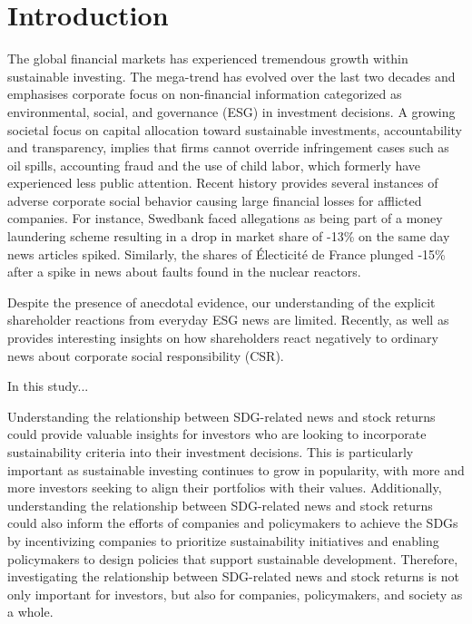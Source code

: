 \section{Introduction} \label{sec:intro}

The global financial markets has experienced tremendous growth within sustainable investing. The mega-trend has evolved over the last two decades and emphasises corporate focus on non-financial information categorized as environmental, social, and governance (ESG) in investment decisions. A growing societal focus on capital allocation toward sustainable investments, accountability and transparency, implies that firms cannot override infringement cases such as oil spills, accounting fraud and the use of child labor, which formerly have experienced less public attention. Recent history provides several instances of adverse corporate social behavior causing large financial losses for afflicted companies. For instance, Swedbank faced allegations as being part of a money laundering scheme resulting in a drop in market share of -13\% on the same day news articles spiked. Similarly, the shares of Électicité de France plunged -15\% after a spike in news about faults found in the nuclear reactors. 

Despite the presence of anecdotal evidence, our understanding of the explicit shareholder reactions from everyday ESG news are limited. Recently, \cite{Blancard_ESG_sentiment} as well as \cite{kruger2015corporate} provides interesting insights on how shareholders react negatively to ordinary news about corporate social responsibility (CSR). 

In this study...



Understanding the relationship between SDG-related news and stock returns could provide valuable insights for investors who are looking to incorporate sustainability criteria into their investment decisions. This is particularly important as sustainable investing continues to grow in popularity, with more and more investors seeking to align their portfolios with their values. Additionally, understanding the relationship between SDG-related news and stock returns could also inform the efforts of companies and policymakers to achieve the SDGs by incentivizing companies to prioritize sustainability initiatives and enabling policymakers to design policies that support sustainable development. Therefore, investigating the relationship between SDG-related news and stock returns is not only important for investors, but also for companies, policymakers, and society as a whole.


